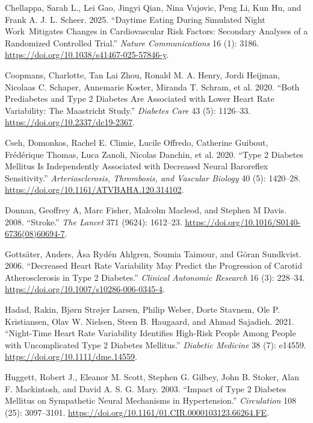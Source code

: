 \documentclass[
  a4paper,
  headsepline=true,
  open=any]{scrbook}
\newlength{\cslhangindent}
\newlength{\cslentryspacingunit} %
\newenvironment{CSLReferences}[2] %
 {%
  \setlength{\parindent}{0pt}
  \ifodd #1
  \let\oldpar\par
  \def\par{\hangindent=\cslhangindent\oldpar}
  \fi
  \setlength{\parskip}{#2\cslentryspacingunit}
 }%
 {}
\begin{document}
\begin{CSLReferences}{1}{0}
\leavevmode{}%
Chellappa, Sarah L., Lei Gao, Jingyi Qian, Nina Vujovic, Peng Li, Kun
Hu, and Frank A. J. L. Scheer. 2025. {``Daytime Eating During Simulated
Night Work~Mitigates Changes in Cardiovascular Risk Factors: Secondary
Analyses of a Randomized Controlled Trial.''} \emph{Nature
Communications} 16 (1): 3186.
\url{https://doi.org/10.1038/s41467-025-57846-y}.

\leavevmode{}%
Coopmans, Charlotte, Tan Lai Zhou, Ronald M. A. Henry, Jordi Heijman,
Nicolaas C. Schaper, Annemarie Koster, Miranda T. Schram, et al. 2020.
{``Both Prediabetes and Type 2 Diabetes Are Associated with Lower Heart
Rate Variability: The Maastricht Study.''} \emph{Diabetes Care} 43 (5):
1126--33. \url{https://doi.org/10.2337/dc19-2367}.

\leavevmode{}%
Cseh, Domonkos, Rachel E. Climie, Lucile Offredo, Catherine Guibout,
Frédérique Thomas, Luca Zanoli, Nicolas Danchin, et al. 2020. {``Type 2
Diabetes Mellitus Is Independently Associated with Decreased Neural
Baroreflex Sensitivity.''} \emph{Arteriosclerosis, Thrombosis, and
Vascular Biology} 40 (5): 1420--28.
\url{https://doi.org/10.1161/ATVBAHA.120.314102}.

\leavevmode{}%
Donnan, Geoffrey A, Marc Fisher, Malcolm Macleod, and Stephen M Davis.
2008. {``Stroke.''} \emph{The Lancet} 371 (9624): 1612--23.
\url{https://doi.org/10.1016/S0140-6736(08)60694-7}.

\leavevmode{}%
Gottsäter, Anders, Åsa Rydén Ahlgren, Soumia Taimour, and Göran
Sundkvist. 2006. {``Decreased Heart Rate Variability May Predict the
Progression of Carotid Atherosclerosis in Type 2 Diabetes.''}
\emph{Clinical Autonomic Research} 16 (3): 228--34.
\url{https://doi.org/10.1007/s10286-006-0345-4}.

\leavevmode{}%
Hadad, Rakin, Bjørn Strøjer Larsen, Philip Weber, Dorte Stavnem, Ole P.
Kristiansen, Olav W. Nielsen, Steen B. Haugaard, and Ahmad Sajadieh.
2021. {``Night-Time Heart Rate Variability Identifies High-Risk People
Among People with Uncomplicated Type 2 Diabetes Mellitus.''}
\emph{Diabetic Medicine} 38 (7): e14559.
\url{https://doi.org/10.1111/dme.14559}.

\leavevmode{}%
Huggett, Robert J., Eleanor M. Scott, Stephen G. Gilbey, John B. Stoker,
Alan F. Mackintosh, and David A. S. G. Mary. 2003. {``Impact of Type 2
Diabetes Mellitus on Sympathetic Neural Mechanisms in Hypertension.''}
\emph{Circulation} 108 (25): 3097--3101.
\url{https://doi.org/10.1161/01.CIR.0000103123.66264.FE}.


\end{CSLReferences}
\end{document}
